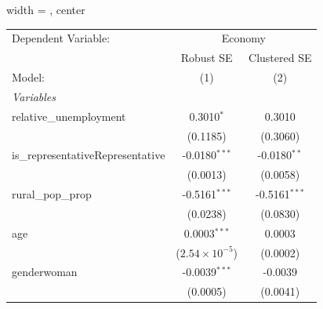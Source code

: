 
\begingroup
\centering
\begin{adjustbox}{width = \textwidth, center}
   \begin{tabular}{lcc}
      \tabularnewline \midrule \midrule
      Dependent Variable: & \multicolumn{2}{c}{Economy}\\
                                                                                                       & Robust SE               & Clustered SE \\   
      Model:                                                                                           & (1)                     & (2)\\  
      \midrule
      \emph{Variables}\\
      relative\_unemployment                                                                           & 0.3010$^{*}$            & 0.3010\\   
                                                                                                       & (0.1185)                & (0.3060)\\   
      is\_representativeRepresentative                                                                 & -0.0180$^{***}$         & -0.0180$^{**}$\\   
                                                                                                       & (0.0013)                & (0.0058)\\   
      rural\_pop\_prop                                                                                 & -0.5161$^{***}$         & -0.5161$^{***}$\\   
                                                                                                       & (0.0238)                & (0.0830)\\   
      age                                                                                              & 0.0003$^{***}$          & 0.0003\\   
                                                                                                       & ($2.54\times 10^{-5}$)  & (0.0002)\\   
      genderwoman                                                                                      & -0.0039$^{***}$         & -0.0039\\   
                                                                                                       & (0.0005)                & (0.0041)\\   

\end{tabular}
\end{adjustbox}
